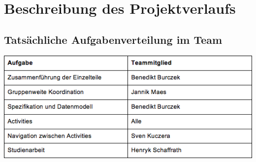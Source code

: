 \section{Beschreibung des Projektverlaufs}
\label{concept}

\subsection{Tatsächliche Aufgabenverteilung im Team}
\includegraphics[scale=0.8]{img/geplanteAugabenVerteilung}
